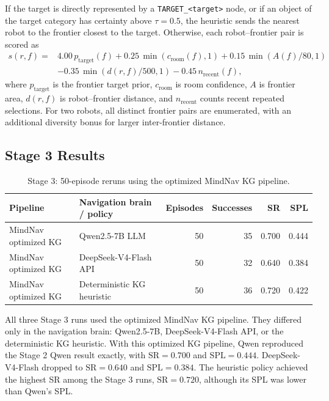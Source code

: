 \documentclass[11pt]{article}
\newcommand{\tablefont}{\footnotesize}
\begin{document}
If the target is directly represented by a \texttt{TARGET\_<target>} node, or if
an object of the target category has certainty above \(\tau=0.5\), the heuristic
sends the nearest robot to the frontier closest to the target. Otherwise, each
robot--frontier pair is scored as
\[
\begin{split}
s(r,f) ={}& 4.00\,p_{\mathrm{target}}(f)
          + 0.25\,\min(c_{\mathrm{room}}(f),1)
          + 0.15\,\min(A(f)/80,1) \\
        & - 0.35\,\min(d(r,f)/500,1)
          - 0.45\,n_{\mathrm{recent}}(f),
\end{split}
\]
where \(p_{\mathrm{target}}\) is the frontier target prior,
\(c_{\mathrm{room}}\) is room confidence, \(A\) is frontier area,
\(d(r,f)\) is robot--frontier distance, and \(n_{\mathrm{recent}}\) counts
recent repeated selections. For two robots, all distinct frontier pairs are
enumerated, with an additional diversity bonus for larger inter-frontier
distance.

\subsection{Stage 3 Results}

\begin{table}[t]
\centering
\tablefont
\caption{Stage 3: 50-episode reruns using the optimized MindNav KG pipeline.}
\label{tab:stage3-reruns}
\begin{tabular}{llrrrr}
\hline
Pipeline & Navigation brain / policy & Episodes & Successes & SR & SPL \\
\hline
MindNav optimized KG & Qwen2.5-7B LLM & 50 & 35 & 0.700 & 0.444 \\
MindNav optimized KG & DeepSeek-V4-Flash API & 50 & 32 & 0.640 & 0.384 \\
MindNav optimized KG & Deterministic KG heuristic & 50 & 36 & 0.720 & 0.422 \\
\hline
\end{tabular}
\end{table}

All three Stage 3 runs used the optimized MindNav KG pipeline. They differed
only in the navigation brain: Qwen2.5-7B, DeepSeek-V4-Flash API, or the
deterministic KG heuristic. With this optimized KG pipeline, Qwen reproduced the
Stage 2 Qwen result exactly, with \(\mathrm{SR}=0.700\) and
\(\mathrm{SPL}=0.444\). DeepSeek-V4-Flash dropped to \(\mathrm{SR}=0.640\) and
\(\mathrm{SPL}=0.384\). The heuristic
policy achieved the highest SR among the Stage 3 runs, \(\mathrm{SR}=0.720\),
although its SPL was lower than Qwen's SPL.
\end{document}
